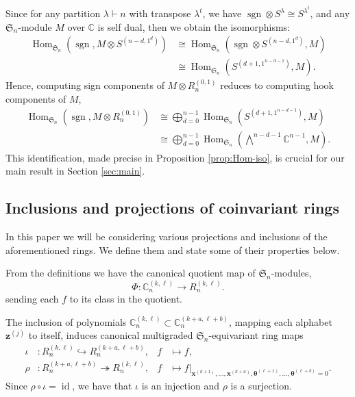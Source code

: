 \documentclass[11pt, reqno]{amsart}
\theoremstyle{definition}
\theoremstyle{remark}
\numberwithin{equation}{section}
\newcommand{\0}{\emptyset}
\newcommand{\C}{\mathbb{C}}
\renewcommand{\S}{\mathfrak{S}}
\DeclareMathOperator{\sgn}{sgn}
\DeclareMathOperator{\Hom}{Hom}
\DeclareMathOperator{\id}{id}
\begin{document}
Since for any partition $\lambda \vdash n$ with transpose $\lambda^t$, we have $\sgn \otimes S^\lambda \cong S^{\lambda^t}$, and any $\S_n$-module $M$ over $\C$ is self dual, then we obtain the isomorphisms: 
\begin{equation}\label{eq:hom-isomorphism-hook-shapes}
\begin{aligned}
    \Hom_{\S_n}\left(\sgn, M \otimes S^{(n-d,1^d)}\right) 
    &\cong 
    \Hom_{\S_n}\left(\sgn \otimes  S^{(n-d,1^d)}, M\right) \\
    &\cong 
    \Hom_{\S_n}\left(S^{(d+1,1^{n-d-1})}, M\right).
\end{aligned}
\end{equation}
Hence, computing sign components of $M \otimes R_n^{(0,1)}$ reduces to computing hook components of $M$, 
\begin{equation}\label{eq:sign-hook}
\begin{aligned}
    \Hom_{\S_n}\left(\sgn, M \otimes R_n^{(0,1)}\right) 
    &\cong 
    \bigoplus_{d=0}^{n-1} \Hom_{\S_n}\left(S^{(d+1,1^{n-d-1})}, M\right) \\
    &\cong 
    \bigoplus_{d=0}^{n-1} \Hom_{\S_n}\left(\bigwedge\nolimits^{n-d-1}\C^{n-1}, M\right). 
\end{aligned}
\end{equation}
This identification, made precise in Proposition \ref{prop:Hom-iso}, is crucial for our main result in Section \ref{sec:main}.  

\subsection{Inclusions and projections of coinvariant rings} 
In this paper we will be considering various projections and inclusions of the aforementioned rings. We define them and state some of their properties below.

From the definitions we have the canonical quotient map of $\S_n$-modules, 
\begin{equation}\label{eq:quotient-map}
\Phi: \C_n^{(k,\ell)} \to R_n^{(k,\ell)}.
\end{equation}
sending each $f$ to its class in the quotient.

The inclusion of polynomials $\C_n^{(k,\ell)} \subset \C_n^{(k+a,\ell+b)}$, mapping each alphabet $\bm{z}^{(j)}$ to itself,
induces canonical multigraded $\S_n$-equivariant ring maps
\begin{align}
\iota &: R_n^{(k,\ell)} \hookrightarrow R_n^{(k+a,\ell+b)}, & f &\mapsto f, \label{eq:ring-inclusion}\\
\rho &: R_n^{(k+a,\ell+b)} \twoheadrightarrow R_n^{(k,\ell)}, & f &\mapsto f|_{\bm{x}^{(k+1)},\ldots, \bm{x}^{(k+a)}, \bm{\theta}^{(\ell+1)}, \ldots, \bm{\theta}^{(\ell+b)}=0}.
\end{align}
Since $\rho \circ \iota = \id$, we have that $\iota$ is an injection and $\rho$ is a surjection. 
\end{document}
